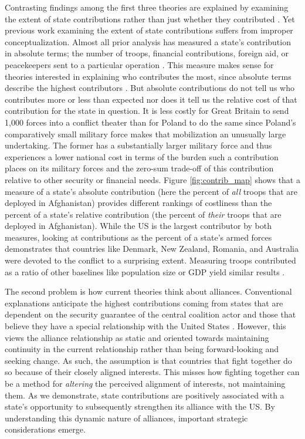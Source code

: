 \documentclass[12pt,letterpaper]{article}
\begin{document}
		Contrasting findings among the first three theories are explained by examining the extent of state contributions rather than just whether they contributed \citep[4]{cranmer_coalitionqualitymultinational_2017}. Yet previous work examining the extent of state contributions suffers from improper conceptualization. Almost all prior analysis has measured a state's contribution in absolute terms; the number of troops, financial contributions, foreign aid, or peacekeepers sent to a particular operation \citep{mello_democraticparticipationarmed_2014, haesebrouck_explainingmemberstates_2016}. This measure makes sense for theories interested in explaining who contributes the most, since absolute terms describe the highest contributors \citep[40-41]{bogers_missionafghanistanwho_2013}. But absolute contributions do not tell us who contributes more or less than expected nor does it tell us the relative cost of that contribution for the state in question. It is less costly for Great Britain to send 1,000 forces into a conflict theater than for Poland to do the same since Poland's comparatively small military force makes that mobilization an unusually large undertaking. The former has a substantially larger military force and thus experiences a lower national cost in terms of the burden such a contribution places on its military forces and the zero-sum trade-off of this contribution relative to other security or financial needs. Figure \ref{fig:contrib_map} shows that a measure of a state's absolute contribution (here the percent of \emph{all} troops that are deployed in Afghanistan) provides different rankings of costliness than the percent of a state's relative contribution (the percent of \textit{their} troops that are deployed in Afghanistan). While the US is the largest contributor by both measures, looking at contributions as the percent of a state's armed forces demonstrates that countries like Denmark, New Zealand, Romania, and Australia were devoted to the conflict to a surprising extent. Measuring troops contributed as a ratio of other baselines like population size or GDP yield similar results \citep[41]{bogers_missionafghanistanwho_2013}.

		The second problem is how current theories think about alliances. Conventional explanations anticipate the highest contributions coming from states that are dependent on the security guarantee of the central coalition actor and those that believe they have a special relationship with the United States \citep{graeger_revivalatlanticismnato_2009, biehl_strategiccultureseurope_2013, howorth_securitydefencepolicy_2014, haesebrouck_democraticparticipationair_2016}. However, this views the alliance relationship as static and oriented towards maintaining continuity in the current relationship rather than being forward-looking and seeking change. As such, the assumption is that countries that fight together do so because of their closely aligned interests. This misses how fighting together can be a method for \textit{altering} the perceived alignment of interests, not maintaining them. As we demonstrate, state contributions are positively associated with a state's opportunity to subsequently strengthen its alliance with the US. By understanding this dynamic nature of alliances, important strategic considerations emerge.
		
\end{document}

